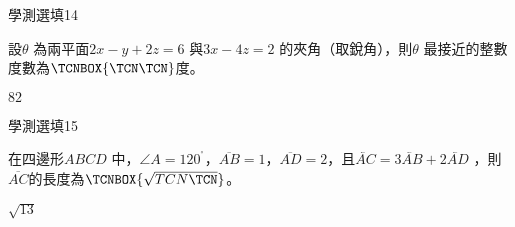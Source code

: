 \begin{QUESTIONS}
\begin{QUESTION}
    \end{QUESTION}
    \begin{QUESTION}
        \begin{ExamInfo}{86}{學測}{選填}{14}
        \end{ExamInfo}
        \begin{ExamAnsRateInfo}{}{}{}{}
        \end{ExamAnsRateInfo}
        \begin{QBODY}
            設$\theta $ 為兩平面$2x-y+2z=6$ 與$3x-4z=2$ 的夾角（取銳角），則$\theta $ 最接近的整數度數為$\TCNBOX{\TCN\TCN}$度。
        \end{QBODY}
        \begin{QFROMS}
        \end{QFROMS}
        \begin{QTAGS}\end{QTAGS}
        \begin{QANS}
            $82$
        \end{QANS}
        \begin{QSOLLIST}
        \end{QSOLLIST}
        \begin{QEMPTYSPACE}
        \end{QEMPTYSPACE}
    \end{QUESTION}
    \begin{QUESTION}
        \begin{ExamInfo}{86}{學測}{選填}{15}
        \end{ExamInfo}
        \begin{ExamAnsRateInfo}{}{}{}{}
        \end{ExamAnsRateInfo}
        \begin{QBODY}
            在四邊形$ABCD$ 中，$\angle A={{120}^{{}^\circ }}$，$\overline{AB}=1$，$\overline{AD}=2$，且$\lvec{AC} = 3 \lvec{AB} +2\lvec{AD}$ ，則$\overline{AC}$的長度為$\TCNBOX{\sqrt{TCN\TCN}}$。
        \end{QBODY}
        \begin{QFROMS}
        \end{QFROMS}
        \begin{QTAGS}\end{QTAGS}
        \begin{QANS}
            $\sqrt{13}$
        \end{QANS}
        \begin{QSOLLIST}
        \end{QSOLLIST}
        \begin{QEMPTYSPACE}

\end{QEMPTYSPACE}
\end{QUESTION}
\end{QUESTIONS}
